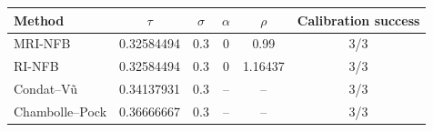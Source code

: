 \begin{tabular}{lccccc}\hline
Method & $\tau$ & $\sigma$ & $\alpha$ & $\rho$ & Calibration success \\
\hline
MRI-NFB & 0.32584494 & 0.3 & 0 & 0.99 & 3/3 \\
RI-NFB & 0.32584494 & 0.3 & 0 & 1.16437 & 3/3 \\
Condat--V{\~u} & 0.34137931 & 0.3 & -- & -- & 3/3 \\
Chambolle--Pock & 0.36666667 & 0.3 & -- & -- & 3/3 \\
\hline\end{tabular}

